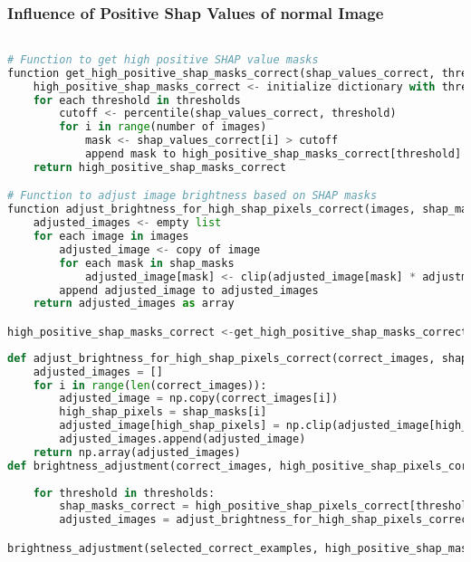 \documentclass{article}
\begin{document}
\subsubsection{Influence of Positive Shap Values of normal Image} 
\begin{lstlisting}[language=Python, caption=Pseudocode to get Positive Shap Values]

# Function to get high positive SHAP value masks
function get_high_positive_shap_masks_correct(shap_values_correct, thresholds=[80, 85, 90])
    high_positive_shap_masks_correct <- initialize dictionary with thresholds as keys
    for each threshold in thresholds
        cutoff <- percentile(shap_values_correct, threshold)
        for i in range(number of images)
            mask <- shap_values_correct[i] > cutoff
            append mask to high_positive_shap_masks_correct[threshold]
    return high_positive_shap_masks_correct

# Function to adjust image brightness based on SHAP masks
function adjust_brightness_for_high_shap_pixels_correct(images, shap_masks, adjustment_factor=0.5)
    adjusted_images <- empty list
    for each image in images
        adjusted_image <- copy of image
        for each mask in shap_masks
            adjusted_image[mask] <- clip(adjusted_image[mask] * adjustment_factor, 0, 1)
        append adjusted_image to adjusted_images
    return adjusted_images as array

high_positive_shap_masks_correct <-get_high_positive_shap_masks_correct(shap_values_correct, [80, 85, 90])

\end{lstlisting}


\begin{lstlisting}[language=Python, caption=Adjusting Brightness for High SHAP Value Pixels]
def adjust_brightness_for_high_shap_pixels_correct(correct_images, shap_masks, adjustment_factor=0.5):
    adjusted_images = []
    for i in range(len(correct_images)):
        adjusted_image = np.copy(correct_images[i])
        high_shap_pixels = shap_masks[i]
        adjusted_image[high_shap_pixels] = np.clip(adjusted_image[high_shap_pixels] * adjustment_factor, 0, 1)
        adjusted_images.append(adjusted_image)
    return np.array(adjusted_images)
def brightness_adjustment(correct_images, high_positive_shap_pixels_correct, model, selected_labels, thresholds=[80, 85, 90], adjustment_factor=0.5):
 
    for threshold in thresholds:
        shap_masks_correct = high_positive_shap_pixels_correct[threshold]
        adjusted_images = adjust_brightness_for_high_shap_pixels_correct(correct_images, shap_masks_correct, adjustment_factor)

brightness_adjustment(selected_correct_examples, high_positive_shap_masks_correct, model, selected_labels)
\end{lstlisting}
\end{document}
